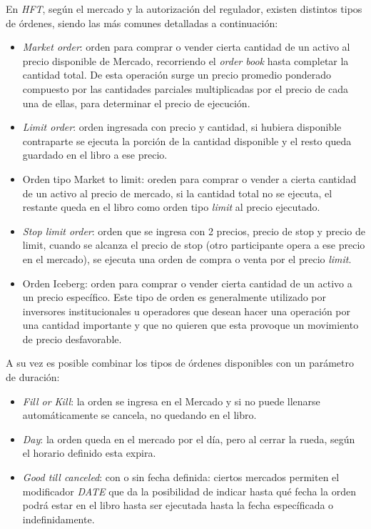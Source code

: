 En \emph{HFT}, según el mercado y la autorización del regulador, existen distintos tipos de órdenes, 
siendo las más comunes detalladas a continuación:
\begin{itemize}
 \item \emph{Market order}: orden para comprar o vender cierta cantidad de un
 activo al precio disponible de Mercado, recorriendo el \emph{order book} hasta
 completar la cantidad total. De esta operación surge un precio promedio
 ponderado compuesto por las cantidades parciales multiplicadas por el precio
 de cada una de ellas, para determinar el precio de ejecución.
 \item \emph{Limit order}: orden ingresada con precio y cantidad, si hubiera
 disponible contraparte se ejecuta la porción de la cantidad disponible y el
 resto queda guardado en el libro a ese precio. 
 \item Orden tipo Market to limit: oreden para comprar o vender a cierta
 cantidad de un activo al precio de mercado, si la cantidad total no se
 ejecuta, el restante queda en el libro como orden tipo \emph{limit} al precio
 ejecutado.
 \item \emph{Stop limit order}: orden que se ingresa con 2 precios, precio de
 stop y precio de limit, cuando se alcanza el precio de stop (otro participante
 opera a ese precio en el mercado), se ejecuta una orden de compra o venta por
 el precio \emph{limit}.
 \item Orden Iceberg: orden para comprar o vender cierta cantidad de un activo
 a un precio específico. Este tipo de orden es generalmente utilizado por
 inversores institucionales u operadores que desean hacer una operación por una
 cantidad importante y que no quieren que esta provoque un movimiento de precio
 desfavorable.
\end{itemize}

A su vez es posible combinar los tipos de órdenes disponibles con un parámetro
de duración:
\begin{itemize}
 \item \emph{Fill or Kill}: la orden se ingresa en el Mercado y si no puede llenarse
 automáticamente se cancela, no quedando en el libro.
 \item \emph{Day}: la orden queda en el mercado por el día, pero al cerrar la rueda,
 según el horario definido esta expira.
 \item \emph{Good till canceled}: con o sin fecha definida: ciertos mercados permiten
 el modificador \emph{DATE} que da la posibilidad de indicar hasta qué fecha la orden
 podrá estar en el libro hasta ser ejecutada hasta la fecha específicada o
 indefinidamente. 
\end{itemize}

